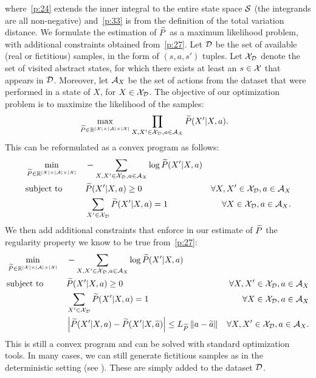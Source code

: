 where~\eqref{p:24} extends the inner integral to the entire state space $\mathcal{S}$ (the integrands are all non-negative) and~\eqref{p:33} is from the definition of the total variation distance.
We formulate the estimation of $\widetilde{P}$ as a maximum likelihood problem, with additional constraints obtained from~\eqref{p:27}.
Let $\mathcal{D}$ be the set of available (real or fictitious) samples, in the form of $(s,a,s')$ tuples. Let $\mathcal{X}_{\mathcal{D}}$ denote the set of visited abstract states, \ie for which there exists at least an $s\in\mathcal{X}$ that appears in $\mathcal{D}$. Moreover, let $\mathcal{A}_{X}$ be the set of actions from the dataset that were performed in a state of $X$, for $X\in\mathcal{X}_{\mathcal{D}}$. 
The objective of our optimization problem is to maximize the likelihood of the samples:
%
\begin{align}
&\max_{\widetilde{P}\in\mathbb{R}^{|\mathcal{X}|\times|\mathcal{A}|\times|\mathcal{X}|}} \prod_{X,X'\in\mathcal{X}_{\mathcal{D}}, a\in\mathcal{A}_{X}}\widetilde{P}(X'|X,a).
\end{align}
%
This can be reformulated as a convex program as follows:
%
\begin{align}
&\min_{\widetilde{P}\in\mathbb{R}^{|\mathcal{X}|\times|\mathcal{A}|\times|\mathcal{X}|}} &&-\sum_{X,X'\in\mathcal{X}_{\mathcal{D}}, a\in\mathcal{A}_{X}}\log\widetilde{P}(X'|X,a) \nonumber\\
&\text{subject to} &&\widetilde{P}(X'|X,a) \geq 0 &\forall X,X'\in\mathcal{X}_{\mathcal{D}}, a\in\mathcal{A}_{X} \nonumber\\
& &&\sum_{X'\in\mathcal{X}_{\mathcal{D}}}\widetilde{P}(X'|X,a) = 1 &\forall X\in\mathcal{X}_{\mathcal{D}}, a\in\mathcal{A}_{X}.
\end{align}
%
We then add additional constraints that enforce in our estimate of $\widetilde{P}$ the regularity property we know to be true from~\eqref{p:27}:
%
\begin{align}
&\min_{\widetilde{P}\in\mathbb{R}^{|\mathcal{X}|\times|\mathcal{A}|\times|\mathcal{X}|}} &&-\sum_{X,X'\in\mathcal{X}_{\mathcal{D}}, a\in\mathcal{A}_{X}}\log\widetilde{P}(X'|X,a) \nonumber\\
&\text{subject to} &&\widetilde{P}(X'|X,a) \geq 0 &\forall X,X'\in\mathcal{X}_{\mathcal{D}}, a\in\mathcal{A}_{X} \nonumber\\
& &&\sum_{X'\in\mathcal{X}_{\mathcal{D}}}\widetilde{P}(X'|X,a) = 1 &\forall X\in\mathcal{X}_{\mathcal{D}}, a\in\mathcal{A}_{X} \nonumber\\
& &&\left|\widetilde{P}(X'|X,a) - \widetilde{P}(X'|X,\widetilde{a})\right| \leq L_{\widetilde{P}}\left\|a- \widetilde{a}\right\|_{} &\forall X,X'\in\mathcal{X}_{\mathcal{D}}, a\in\mathcal{A}_{X}. \label{p:26}
\end{align}
%
This is still a convex program and can be solved with standard optimization tools.
In many cases, we can still generate fictitious samples as in the deterministic setting (see ). These are simply added to the dataset $\mathcal{D}$. 

